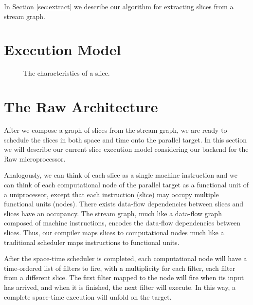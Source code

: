 In Section \ref{sec:extract} we describe our algorithm for extracting
slices from a stream graph.

\section{Execution Model}
\begin{figure}[t]
\centering
{}
\caption{The characteristics of a slice.
\protect\label{fig:slice}}
\end{figure}

\section{The Raw Architecture}
\label{sec:raw}
After we compose a graph of slices from the stream graph, we are ready
to schedule the slices in both space and time onto the parallel
target.  In this section we will describe our current slice execution
model considering our backend for the Raw microprocessor.

Analogously, we can think of each slice as a single machine
instruction and we can think of each computational node of the
parallel target as a functional unit of a uniprocessor, except that
each instruction (slice) may occupy multiple functional units
(nodes). There exists data-flow dependencies between slices and slices
have an occupancy.  The stream graph, much like a data-flow graph
composed of machine instructions, encodes the data-flow dependencies
between slices. Thus, our compiler maps slices to computational nodes
much like a traditional scheduler maps instructions to functional
units.

After the space-time scheduler is completed, each computational node
will have a time-ordered list of filters to fire, with a multiplicity
for each filter, each filter from a different slice.  The first
filter mapped to the node will fire when its input has arrived, and
when it is finished, the next filter will execute.  In this way, a
complete space-time execution will unfold on the target.

